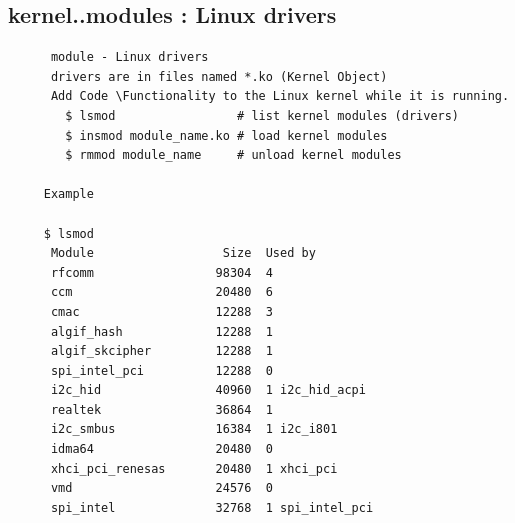 \documentclass[a4paper,12pt]{article}
\begin{document}
\subsection{kernel..modules : Linux drivers }
\begin{verbatim}
      module - Linux drivers
      drivers are in files named *.ko (Kernel Object)
      Add Code \Functionality to the Linux kernel while it is running.
        $ lsmod                 # list kernel modules (drivers)
        $ insmod module_name.ko # load kernel modules
        $ rmmod module_name     # unload kernel modules

     Example
     
     $ lsmod
      Module                  Size  Used by
      rfcomm                 98304  4
      ccm                    20480  6
      cmac                   12288  3
      algif_hash             12288  1
      algif_skcipher         12288  1
      spi_intel_pci          12288  0
      i2c_hid                40960  1 i2c_hid_acpi
      realtek                36864  1
      i2c_smbus              16384  1 i2c_i801
      idma64                 20480  0
      xhci_pci_renesas       20480  1 xhci_pci
      vmd                    24576  0
      spi_intel              32768  1 spi_intel_pci

\end{verbatim}
\end{document}
